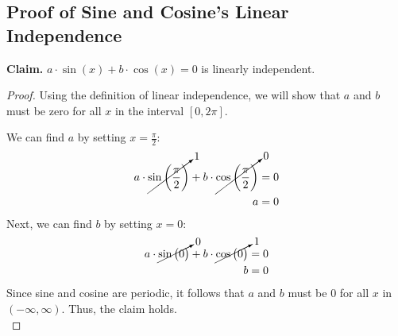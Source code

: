\subsection{Proof of Sine and Cosine's Linear Independence}
\textbf{Claim. } $a \cdot \sin(x) + b \cdot \cos(x) = 0$ is linearly independent.
    \begin{proof}
        Using the definition of linear independence, we will show that $a$ and $b$ must be zero for all $x$ in the interval $[0, 2\pi]$.
        
        \vspace{0.15cm}
        \noindent\ignorespacesafterend
        We can find $a$ by setting $x = \frac{\pi}{2}$:
        \begin{align*}
            a \cdot \cancelto{1}{\sin \bigg(\frac{\pi}{2} \bigg)}
            + b \cdot \cancelto{0}{\cos \bigg(\frac{\pi}{2} \bigg)} &= 0\\
            a &= 0
        \end{align*}
        Next, we can find $b$ by setting $x = 0$:
        \begin{align*}
            a \cdot \cancelto{0}{\sin \big(0 \big)}
            + b \cdot \cancelto{1}{\cos \big(0 \big)} &= 0\\
            b &= 0
        \end{align*}
        \noindent
        Since sine and cosine are periodic, it follows that $a$ and $b$ must be $0$ for all $x$ in $(-\infty, \infty)$.  Thus, the claim holds.\\
    \end{proof}
